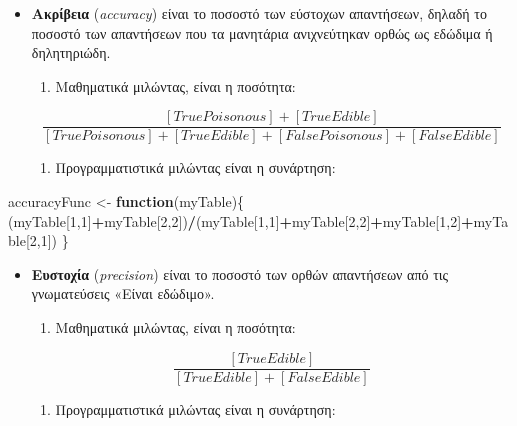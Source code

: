 \documentclass[
]{article}
\newenvironment{Shaded}{\begin{snugshade}}{\end{snugshade}}
\newcommand{\ControlFlowTok}[1]{\textcolor[rgb]{0.13,0.29,0.53}{\textbf{#1}}}
\newcommand{\DecValTok}[1]{\textcolor[rgb]{0.00,0.00,0.81}{#1}}
\newcommand{\NormalTok}[1]{#1}
\newcommand{\OtherTok}[1]{\textcolor[rgb]{0.56,0.35,0.01}{#1}}
\newcommand{\SpecialCharTok}[1]{\textcolor[rgb]{0.81,0.36,0.00}{\textbf{#1}}}
\providecommand{\tightlist}{%
  \setlength{\itemsep}{0pt}\setlength{\parskip}{0pt}}
\begin{document}
\begin{itemize}
\item
  \textbf{Ακρίβεια} (\emph{accuracy}) είναι το ποσοστό των εύστοχων
  απαντήσεων, δηλαδή το ποσοστό των απαντήσεων που τα μανητάρια
  ανιχνεύτηκαν ορθώς ως εδώδιμα ή δηλητηριώδη.

  \begin{enumerate}
  \def\labelenumi{\arabic{enumi}.}
  \tightlist
  \item
    Μαθηματικά μιλώντας, είναι η ποσότητα:
  \end{enumerate}

  \[
  \dfrac{[TruePoisonous]+[TrueEdible]}{[TruePoisonous]+[TrueEdible]+[FalsePoisonous]+[FalseEdible]}
  \]

  \begin{enumerate}
  \def\labelenumi{\arabic{enumi}.}
  \setcounter{enumi}{1}
  \tightlist
  \item
    Προγραμματιστικά μιλώντας είναι η συνάρτηση:
  \end{enumerate}
\end{itemize}

\begin{Shaded}
\begin{Highlighting}[]
\NormalTok{accuracyFunc }\OtherTok{\textless{}{-}} \ControlFlowTok{function}\NormalTok{(myTable)\{}
\NormalTok{  (myTable[}\DecValTok{1}\NormalTok{,}\DecValTok{1}\NormalTok{]}\SpecialCharTok{+}\NormalTok{myTable[}\DecValTok{2}\NormalTok{,}\DecValTok{2}\NormalTok{])}\SpecialCharTok{/}\NormalTok{(myTable[}\DecValTok{1}\NormalTok{,}\DecValTok{1}\NormalTok{]}\SpecialCharTok{+}\NormalTok{myTable[}\DecValTok{2}\NormalTok{,}\DecValTok{2}\NormalTok{]}\SpecialCharTok{+}\NormalTok{myTable[}\DecValTok{1}\NormalTok{,}\DecValTok{2}\NormalTok{]}\SpecialCharTok{+}\NormalTok{myTable[}\DecValTok{2}\NormalTok{,}\DecValTok{1}\NormalTok{])}
\NormalTok{\}}
\end{Highlighting}
\end{Shaded}

\begin{itemize}
\item
  \textbf{Ευστοχία} (\emph{precision}) είναι το ποσοστό των ορθών
  απαντήσεων από τις γνωματεύσεις «Είναι εδώδιμο».

  \begin{enumerate}
  \def\labelenumi{\arabic{enumi}.}
  \tightlist
  \item
    Μαθηματικά μιλώντας, είναι η ποσότητα:
  \end{enumerate}

  \[
  \dfrac{[TrueEdible]}{[TrueEdible]+[FalseEdible]}
  \]

  \begin{enumerate}
  \def\labelenumi{\arabic{enumi}.}
  \setcounter{enumi}{1}
  \tightlist
  \item
    Προγραμματιστικά μιλώντας είναι η συνάρτηση:
  \end{enumerate}
\end{itemize}
\end{document}
